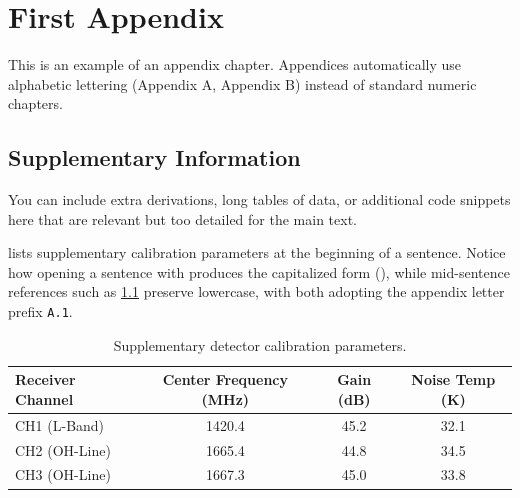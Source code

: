 \chapter{First Appendix}
\label{app:first}

This is an example of an appendix chapter. Appendices automatically use alphabetic lettering (Appendix A, Appendix B) instead of standard numeric chapters.

\section{Supplementary Information}
You can include extra derivations, long tables of data, or additional code snippets here that are relevant but too detailed for the main text.

 lists supplementary calibration parameters at the beginning of a sentence. Notice how opening a sentence with \texttt{\Cref} produces the capitalized form (), while mid-sentence references such as \cref{tab:supp_calibration} preserve lowercase, with both adopting the appendix letter prefix \texttt{A.1}.

\begin{table}[htpb]
    \centering
    \caption{Supplementary detector calibration parameters.}
    \label{tab:supp_calibration}
    \begin{tabular}{lccc}
        \toprule
        Receiver Channel & Center Frequency (MHz) & Gain (dB) & Noise Temp (K) \\
        \midrule
        CH1 (L-Band) & 1420.4 & 45.2 & 32.1 \\
        CH2 (OH-Line) & 1665.4 & 44.8 & 34.5 \\
        CH3 (OH-Line) & 1667.3 & 45.0 & 33.8 \\
        \bottomrule
    \end{tabular}
\end{table}
